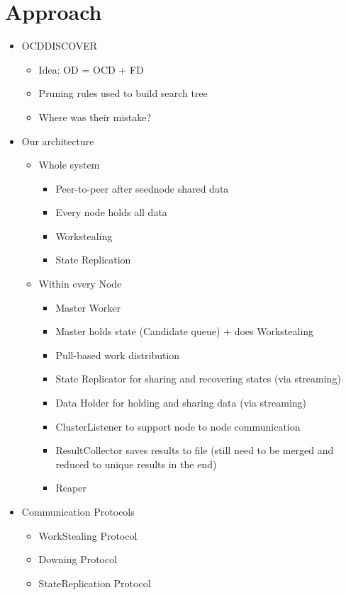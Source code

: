 
\section{Approach}\label{sec:approach}
  \begin{itemize}
  	\item OCDDISCOVER
  	\begin{itemize}
  		\item Idea: OD = OCD + FD
  		\item Pruning rules used to build search tree
  		\item Where was their mistake?
  	\end{itemize}
  	\item Our architecture
  	\begin{itemize}
  		\item Whole system
  		\begin{itemize}
  			\item Peer-to-peer after seednode shared data
  			\item Every node holds all data
  			\item Workstealing
  			\item State Replication
  		\end{itemize}
  		\item Within every Node
  		\begin{itemize}
  			\item Master Worker
  			\item Master holds state (Candidate queue) + does Workstealing
  			\item Pull-based work distribution
  			\item State Replicator for sharing and recovering states (via streaming)
  			\item Data Holder for holding and sharing data (via streaming)
  			\item ClusterListener to support node to node communication
  			\item ResultCollector saves results to file (still need to be merged and reduced to unique results in the end)
  			\item Reaper
  		\end{itemize}
  	\end{itemize}
  	\item Communication Protocols
  	\begin{itemize}
  		\item WorkStealing Protocol
  		\item Downing Protocol
  		\item StateReplication Protocol
  	\end{itemize}
  	
  \end{itemize}